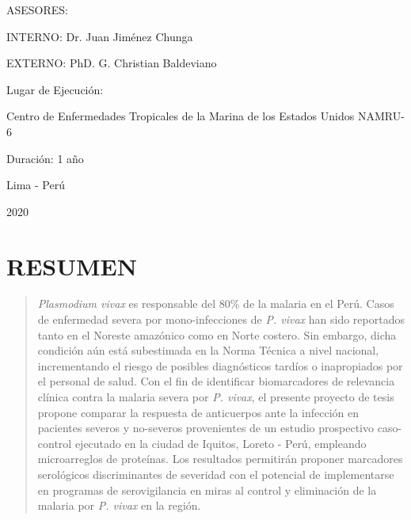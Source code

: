 \documentclass[
  a4paper]{article}
\begin{document}
\begin{centering}
ASESORES:

INTERNO: Dr. Juan Jiménez Chunga %

EXTERNO: PhD. G. Christian Baldeviano

\vspace{.3 cm}

Lugar de Ejecución:

Centro de Enfermedades Tropicales de la Marina de los Estados Unidos 
NAMRU-6

\vspace{.3 cm}

Duración: 1 año

\vspace{1.5 cm}

\Large
Lima - Perú


2020

\end{centering}

\vfill
\restoregeometry
\clearpage

\newpage
\tableofcontents

\newpage
{}

\hypertarget{resumen}{%
\section*{RESUMEN}\label{resumen}}

\begin{quote}
\emph{Plasmodium vivax} es responsable del 80\% de la malaria en el
Perú. Casos de enfermedad severa por mono-infecciones de \emph{P. vivax}
han sido reportados tanto en el Noreste amazónico como en Norte costero.
Sin embargo, dicha condición aún está subestimada en la Norma Técnica a
nivel nacional, incrementando el riesgo de posibles diagnósticos tardíos
o inapropiados por el personal de salud. Con el fin de identificar
biomarcadores de relevancia clínica contra la malaria severa por
\emph{P. vivax}, el presente proyecto de tesis propone comparar la
respuesta de anticuerpos ante la infección en pacientes severos y
no-severos provenientes de un estudio prospectivo caso-control ejecutado
en la ciudad de Iquitos, Loreto - Perú, empleando microarreglos de
proteínas. Los resultados permitirán proponer marcadores serológicos
discriminantes de severidad con el potencial de implementarse en
programas de serovigilancia en miras al control y eliminación de la
malaria por \emph{P. vivax} en la región.
\end{quote}
\end{document}

